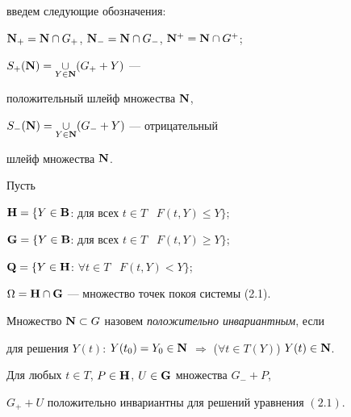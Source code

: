 введем следующие обозначения:





$\bold N_+=\bold N\cap G_+$, $\bold N_-=\bold N\cap G_-$, $\bold


N^+=\bold N\cap G^+$;





$S_+(\bold N)=\mathop{\cup}\limits_{Y\in\bold N}(G_++Y)$ ---


положительный шлейф множества $\bold N$,





$S_-(\bold N)=\mathop{\cup}\limits_{Y\in\bold N}(G_-+Y)$ --- отрицательный


шлейф множества $\bold N$.





Пусть


$\bold H=\{Y\in\bold B$: для всех $t\in T$ \ $F(t,Y)\le Y\}$;





\hspace*{1.22cm}$\bold G=\{Y\in\bold B$: для всех $t\in T$ \ $F(t,Y)\ge Y\}$;





\hspace*{1.22cm}$\bold Q=\{Y\in\bold H$: $\forall t\in T$ \ $F(t,Y)<Y\}$;





\hspace*{1.22cm}$\Omega=\bold H\cap\bold G$ --- множество точек покоя системы (2.1).





Множество $\bold N\subset G$ назовем {\it положительно инвариантным}, если


для решения $Y(t)$: $Y(t_0)=Y_0\in\bold N$ $\Rightarrow$ ($\forall t\in


T(Y)$) $Y(t)\in\bold N$.





\begin{lem}


Для любых $t\in T$, $P\in\bold H$, $U\in\bold G$ множества $G_-+P$,


$G_++U$ положительно инвариантны для решений уравнения $(2.1)$.


\end{lem}





